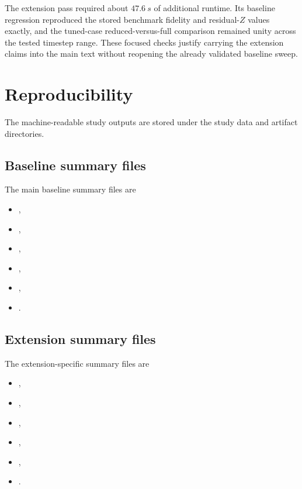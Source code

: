 \documentclass[aps,pra,twocolumn,reprint,floatfix,amsmath,amssymb]{revtex4-2}
\begin{document}
The extension pass required about \(\SI{47.6}{s}\) of additional runtime. Its baseline regression reproduced the stored benchmark fidelity and residual-\(Z\) values exactly, and the tuned-case reduced-versus-full comparison remained unity across the tested timestep range. These focused checks justify carrying the extension claims into the main text without reopening the already validated baseline sweep.

\clearpage
\section{Reproducibility}
\label{app:repro}

\begingroup
\sloppy

The machine-readable study outputs are stored under the study data and artifact directories.

\subsection{Baseline summary files}

The main baseline summary files are
\begin{itemize}
  \item {},
  \item {},
  \item {},
  \item {},
  \item {},
  \item {}.
\end{itemize}

\subsection{Extension summary files}

The extension-specific summary files are
\begin{itemize}
  \item {},
  \item {},
  \item {},
  \item {},
  \item {},
  \item {}.
\end{itemize}
\end{document}
